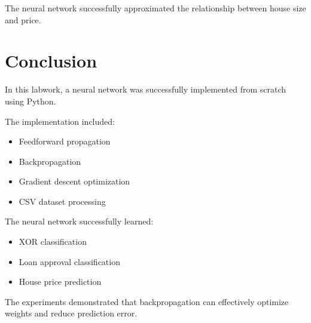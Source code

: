 \documentclass[a4paper,12pt]{article}
\begin{document}
The neural network successfully approximated the relationship between house size and price.

\section{Conclusion}

In this labwork, a neural network was successfully implemented from scratch using Python.

The implementation included:
\begin{itemize}
    \item Feedforward propagation
    \item Backpropagation
    \item Gradient descent optimization
    \item CSV dataset processing
\end{itemize}

The neural network successfully learned:
\begin{itemize}
    \item XOR classification
    \item Loan approval classification
    \item House price prediction
\end{itemize}

The experiments demonstrated that backpropagation can effectively optimize weights and reduce prediction error.
\end{document}
